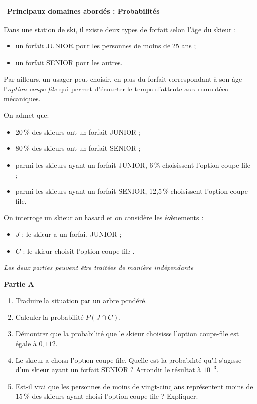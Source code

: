 \medskip

\begin{tabularx}{\linewidth}{|X|}\hline
\textbf{Principaux domaines abordés :} Probabilités\\ \hline
\end{tabularx}

\medskip

Dans une station de ski, il existe deux types de forfait selon l'âge du skieur :

\begin{itemize}
\item un forfait JUNIOR pour les personnes de moins de 25 ans ;
\item un forfait SENIOR pour les autres.
\end{itemize}

Par ailleurs, un usager peut choisir, en plus du forfait correspondant à son âge l'\emph{option  coupe-file} qui permet d'écourter le temps d'attente aux remontées mécaniques.

On admet que:
\begin{itemize}
\item[$\bullet~~$] 20\,\% des skieurs ont un forfait JUNIOR ;
\item[$\bullet~~$] 80\,\% des skieurs ont un forfait SENIOR ;
\item[$\bullet~~$] parmi les skieurs ayant un forfait JUNIOR, 6\,\% choisissent l'option coupe-file ;
\item[$\bullet~~$] parmi les skieurs ayant un forfait SENIOR, 12,5\,\% choisissent l'option coupe-file.
\end{itemize}

On interroge un skieur au hasard et on considère les évènements :

\begin{itemize}
\item[$\bullet~~$] $J$ : \og le skieur a un forfait JUNIOR \fg ;
\item[$\bullet~~$] $C$ : \og le skieur choisit l'option coupe-file \fg.
\end{itemize}

\medskip

\emph{Les deux parties peuvent être traitées de manière indépendante}

\bigskip

\textbf{Partie A}

\medskip

\begin{enumerate}
\item Traduire la situation par un arbre pondéré.
\item Calculer la probabilité $P(J \cap C)$.
\item Démontrer que la probabilité que le skieur choisisse l'option coupe-file est égale à $0,112$.
\item Le skieur a choisi l'option coupe-file. Quelle est la probabilité qu'il s'agisse d'un
skieur ayant un forfait SENIOR ? Arrondir le résultat à $10^{-3}$.
\item Est-il vrai que les personnes de moins de vingt-cinq ans représentent moins de 15\,\% des skieurs ayant choisi l'option coupe-file ? Expliquer.
\end{enumerate}

